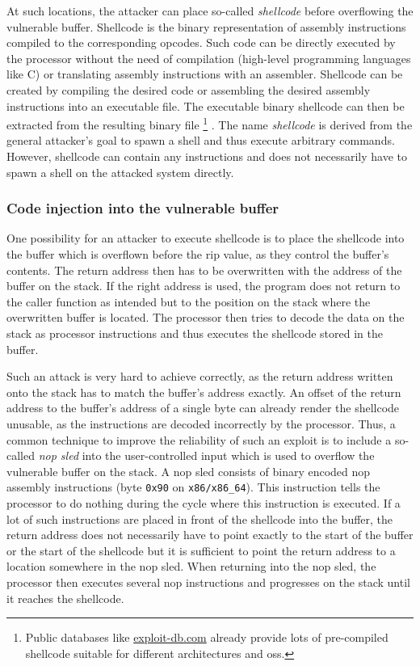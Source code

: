 At such locations, the attacker can place so-called \emph{shellcode} before overflowing the vulnerable buffer.
Shellcode is the binary representation of assembly instructions compiled to the corresponding \glspl{opcode}.
Such code can be directly executed by the processor without the need of compilation (high-level programming languages like C) or translating assembly instructions with an assembler.
Shellcode can be created by compiling the desired code or assembling the desired assembly instructions into an executable file.
The executable binary shellcode can then be extracted from the resulting binary file%
	\footnote{Public databases like \href{https://www.exploit-db.com/shellcodes}{exploit-db.com} already provide lots of pre-compiled shellcode suitable for different architectures and \glspl{os}.}%
.
The name \emph{shellcode} is derived from the general attacker's goal to spawn a shell and thus execute arbitrary commands.
However, shellcode can contain any instructions and does not necessarily have to spawn a shell on the attacked system directly.

\subsubsection{Code injection into the vulnerable buffer}
\label{subsubsec:ci-into-vuln-buffer}

One possibility for an attacker to execute shellcode is to place the shellcode into the buffer which is overflown before the \gls{rip} value, as they control the buffer's contents.
The return address then has to be overwritten with the address of the buffer on the stack.
If the right address is used, the program does not return to the caller function as intended but to the position on the stack where the overwritten buffer is located.
The processor then tries to decode the data on the stack as processor instructions and thus executes the shellcode stored in the buffer.

Such an attack is very hard to achieve correctly, as the return address written onto the stack has to match the buffer's address exactly.
An offset of the return address to the buffer's address of a single byte can already render the shellcode unusable, as the instructions are decoded incorrectly by the processor.
Thus, a common technique to improve the reliability of such an exploit is to include a so-called \emph{\gls{nop} sled} into the user-controlled input which is used to overflow the vulnerable buffer on the stack.
A \gls{nop} sled consists of binary encoded \acrshort{nop} assembly instructions (byte \texttt{0x90} on \texttt{x86/x86\_64}).
This instruction tells the processor to do nothing during the cycle where this instruction is executed.
If a lot of such instructions are placed in front of the shellcode into the buffer, the return address does not necessarily have to point exactly to the start of the buffer or the start of the shellcode but it is sufficient to point the return address to a location somewhere in the \acrshort{nop} sled.
When returning into the \acrshort{nop} sled, the processor then executes several \gls{nop} instructions and progresses on the stack until it reaches the shellcode.


